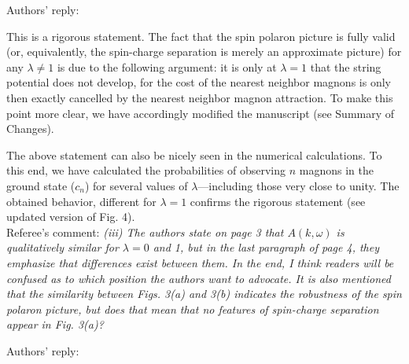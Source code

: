\documentclass[%
 manuscript,
 amsmath,amssymb,
 aps, onecolumn,
prl,
]{revtex4-1}
\begin{document}
Authors' reply:

This is a rigorous statement. The fact that the spin polaron picture is fully valid (or, equivalently, the spin-charge separation is merely an approximate picture) for any $\lambda \neq 1$ is due to the following argument: it is only at $\lambda =1$ that the string potential does not develop, for the cost of the nearest neighbor magnons is only then exactly cancelled by the nearest neighbor magnon attraction. To make this point more clear, we have accordingly modified the manuscript (see Summary of Changes).
 
The above statement can also be nicely seen in the numerical calculations. To this end, we have calculated the probabilities of observing $n$ magnons in the ground state ($c_n$) for several values of $\lambda$---including those very close to unity. The obtained behavior, different for $\lambda =1$  confirms the rigorous statement (see updated version of Fig. 4). 
\\

Referee's comment: {\it \color{blue}(iii) The authors state on page 3 that $A(k,\omega)$ is qualitatively
similar for $\lambda=0$ and 1, but in the last paragraph of page 4, they
emphasize that differences exist between them. In the end, I think
readers will be confused as to which position the authors want to
advocate. It is also mentioned that the similarity between Figs. 3(a)
and 3(b) indicates the robustness of the spin polaron picture, but
does that mean that no features of spin-charge separation appear in
Fig. 3(a)?}

Authors' reply:
\end{document}
